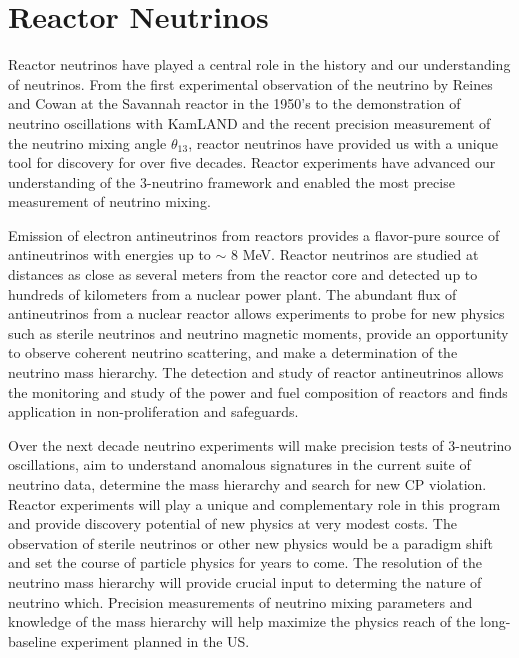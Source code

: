 \section{Reactor Neutrinos}
\label{sec:Reactor}
Reactor neutrinos have played a central role in the history and our understanding of neutrinos.  From the first experimental observation of the neutrino by Reines and Cowan at the Savannah reactor in the 1950's to the demonstration of neutrino oscillations with KamLAND and the recent precision measurement of the neutrino mixing angle $\theta_{13}$, reactor neutrinos have provided us with a unique tool for discovery for over five decades. Reactor experiments have advanced our understanding of the 3-neutrino framework and enabled the most precise measurement of neutrino mixing.

Emission of electron antineutrinos from reactors provides a flavor-pure source of antineutrinos with energies up to $\sim$ 8 MeV. Reactor neutrinos are studied at distances as close as several meters from the reactor core and detected up to hundreds of kilometers from a nuclear power plant.  The abundant flux of antineutrinos from a nuclear reactor allows experiments to probe for new physics such as sterile neutrinos and neutrino magnetic moments, provide an opportunity to observe coherent neutrino scattering,  and make a determination of the neutrino mass hierarchy. The detection and study of reactor antineutrinos allows the monitoring and study of the power and fuel composition of reactors and finds application in non-proliferation and safeguards. 

Over the next decade neutrino experiments will make precision tests of 3-neutrino oscillations, aim to understand anomalous signatures in the current suite of neutrino data, determine the mass hierarchy and search for new CP violation. Reactor experiments will play a unique and complementary role in this program and provide discovery potential of new physics at very modest costs. The observation of sterile neutrinos or other new physics would be a paradigm shift and set the course of particle physics for years to come. The resolution of the neutrino mass hierarchy will provide crucial input to determing
the nature of neutrino which.  Precision measurements of neutrino mixing parameters and knowledge of the mass hierarchy will help maximize the physics reach of the long-baseline experiment planned in the US. 

